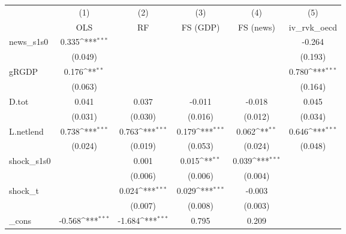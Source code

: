 {
\def\sym#1{\ifmmode^{#1}\else\(^{#1}\)\fi}
\begin{tabular}{l*{5}{c}}
\toprule
            &\multicolumn{1}{c}{(1)}&\multicolumn{1}{c}{(2)}&\multicolumn{1}{c}{(3)}&\multicolumn{1}{c}{(4)}&\multicolumn{1}{c}{(5)}\\
            &\multicolumn{1}{c}{OLS}&\multicolumn{1}{c}{RF}&\multicolumn{1}{c}{FS (GDP)}&\multicolumn{1}{c}{FS (news)}&\multicolumn{1}{c}{iv\_rvk\_oecd}\\
\midrule
news\_s1s0   &       0.335\sym{***}&                     &                     &                     &      -0.264         \\
            &     (0.049)         &                     &                     &                     &     (0.193)         \\
\addlinespace
gRGDP       &       0.176\sym{**} &                     &                     &                     &       0.780\sym{***}\\
            &     (0.063)         &                     &                     &                     &     (0.164)         \\
\addlinespace
D.tot       &       0.041         &       0.037         &      -0.011         &      -0.018         &       0.045         \\
            &     (0.031)         &     (0.030)         &     (0.016)         &     (0.012)         &     (0.034)         \\
\addlinespace
L.netlend   &       0.738\sym{***}&       0.763\sym{***}&       0.179\sym{***}&       0.062\sym{**} &       0.646\sym{***}\\
            &     (0.024)         &     (0.019)         &     (0.053)         &     (0.024)         &     (0.048)         \\
\addlinespace
shock\_s1s0  &                     &       0.001         &       0.015\sym{**} &       0.039\sym{***}&                     \\
            &                     &     (0.006)         &     (0.006)         &     (0.004)         &                     \\
\addlinespace
shock\_t     &                     &       0.024\sym{***}&       0.029\sym{***}&      -0.003         &                     \\
            &                     &     (0.007)         &     (0.008)         &     (0.003)         &                     \\
\addlinespace
\_cons      &      -0.568\sym{***}&      -1.684\sym{***}&       0.795         &       0.209         &                     \\

\end{tabular}}
